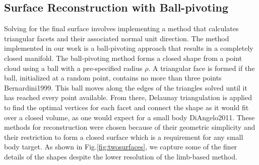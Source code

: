 \subsection{Surface Reconstruction with Ball-pivoting}

Solving for the final surface involves implementing a method that calculates triangular facets and their associated normal unit direction. The method implemented in our work is a ball-pivoting approach that results in a completely closed manifold. The ball-pivoting method forms a closed shape from a point cloud using a ball with a pre-specified radius $\rho$. A triangular face is formed if the ball, initialized at a random point, contains no more than three points {Bernardini1999}. This ball moves along the edges of the triangles solved until it has reached every point available. From there, Delaunay triangulation is applied to find the optimal vertices for each facet and connect the shape as it would fit over a closed volume, as one would expect for a small body {DiAngelo2011}. These methods for reconstruction were chosen because of their geometric simplicity and their restriction to form a closed surface which is a requirement for any small body target. As shown in Fig.\ref{fig:twosurfaces}, we capture some of the finer details of the shapes despite the lower resolution of the limb-based method. 
